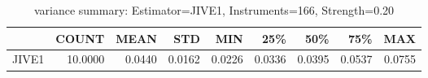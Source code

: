 \begin{table}[ht]
\centering
\caption{variance summary: Estimator=JIVE1, Instruments=166, Strength=0.20}
\begin{tabular}{lrrrrrrrr}
\toprule
 & COUNT & MEAN & STD & MIN & 25\% & 50\% & 75\% & MAX \\
\midrule
JIVE1 & 10.0000 & 0.0440 & 0.0162 & 0.0226 & 0.0336 & 0.0395 & 0.0537 & 0.0755 \\
\bottomrule
\end{tabular}
\end{table}
